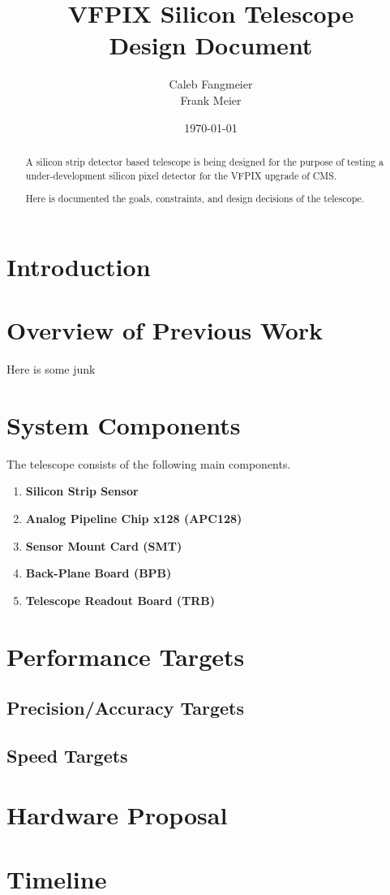\documentclass{article}
\newcommand{\itemt}[1]{\item \textbf{#1}}
\begin{document}
\title{VFPIX Silicon Telescope \\ Design Document}
\author{Caleb Fangmeier \\
        Frank Meier}
\date{\today}


\maketitle

\begin{abstract}
  A silicon strip detector based telescope is being designed for the purpose of testing a under-development silicon pixel detector for the VFPIX upgrade of CMS.

  Here is documented the goals, constraints, and design decisions of the telescope.
\end{abstract}

\newpage

\tableofcontents

\newpage

\section{Introduction}

\section{Overview of Previous Work}
Here is some junk\cite{Turner2012}
\section{System Components}
The telescope consists of the following main components.
\begin{enumerate}
  \itemt{Silicon Strip Sensor}
  \itemt{Analog Pipeline Chip x128 (APC128)}
  \itemt{Sensor Mount Card (SMT)}
  \itemt{Back-Plane Board (BPB)}
  \itemt{Telescope Readout Board (TRB)}
\end{enumerate}

\section{Performance Targets}
\subsection{Precision/Accuracy Targets}
\subsection{Speed Targets}

\section{Hardware Proposal}

\section{Timeline}




\end{document}
